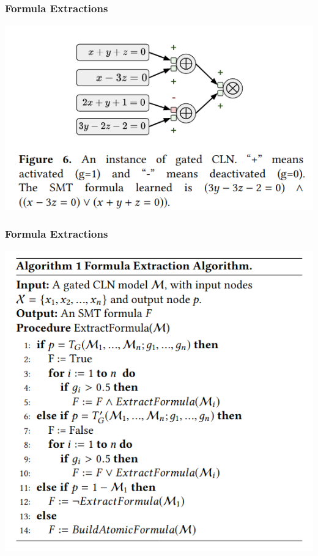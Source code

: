 \documentclass[11pt]{beamer}
\begin{document}
\begin{frame}\frametitle{Formula Extractions}
\begin{center}
\includegraphics[scale=0.5]{6.png}
\end{center}
\end{frame}
\begin{frame}\frametitle{Formula Extractions}
\begin{center}
\includegraphics[scale=0.4]{8.png}
\end{center}
\end{frame}
\end{document}
